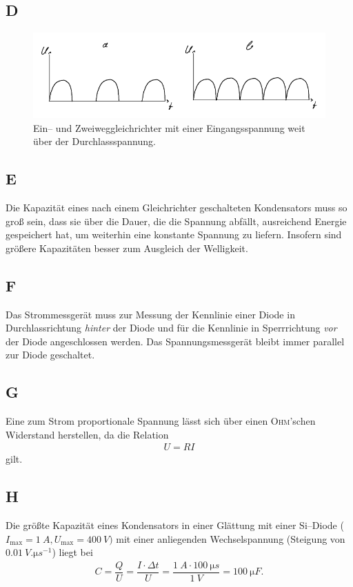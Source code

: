 \documentclass[a4paper,10pt]{article}
\numberwithin{equation}{section}
\begin{document}
\newpage
\subsection{D}
\begin{figure}[h]
	\centering
	\includegraphics[width=\textwidth]{D_crop.pdf}
	\caption[Ein-- und Zweiweggleichrichter]{Ein-- und Zweiweggleichrichter mit einer Eingangsspannung weit über der Durchlassspannung.}
\end{figure}

\subsection{E}
Die Kapazität eines nach einem Gleichrichter geschalteten Kondensators muss so groß sein, dass sie über die Dauer, die die Spannung abfällt, ausreichend Energie gespeichert hat, um weiterhin eine konstante Spannung zu liefern.
Insofern sind größere Kapazitäten besser zum Ausgleich der Welligkeit.

\subsection{F}
Das Strommessgerät muss zur Messung der Kennlinie einer Diode in Durchlassrichtung \textit{hinter} der Diode und für die Kennlinie in Sperrrichtung \textit{vor} der Diode angeschlossen werden.
Das Spannungsmessgerät bleibt immer parallel zur Diode geschaltet.

\subsection{G}
Eine zum Strom proportionale Spannung lässt sich über einen \textsc{Ohm}'schen Widerstand herstellen, da die Relation
\begin{align}
	U=RI
\end{align}
gilt.

\subsection{H}
Die größte Kapazität eines Kondensators in einer Glättung mit einer Si--Diode ($I_{\text{max}}=\SI{1}{A}, U_{\text{max}}=\SI{400}{V})$ mit einer anliegenden Wechselspannung (Steigung von $\SI{0.01}{V.\micro s ^{-1}}$) liegt bei
\begin{align}
	C=\dfrac{Q}{U}=\dfrac{I\cdot \Delta t}{U}=\dfrac{\SI{1}{A}\cdot \SI{100}{\micro s}}{\SI{1}{V}}=\SI{100}{\micro F}
	.\end{align}
\end{document}
